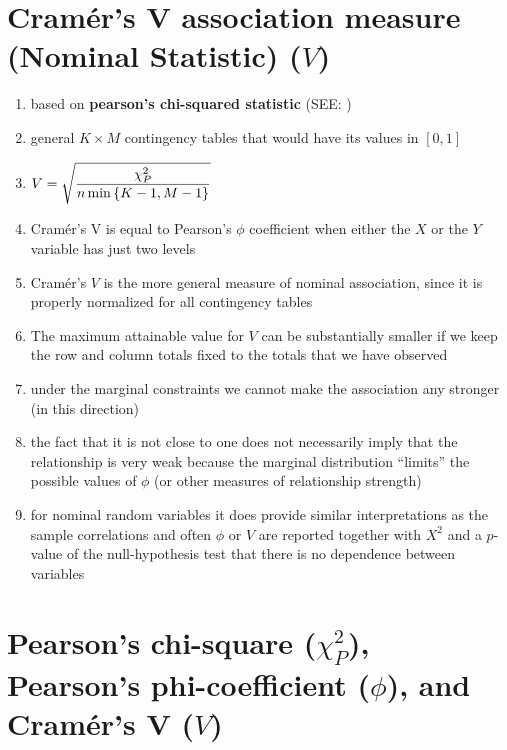 \section{Cramér’s V association measure (Nominal Statistic) ($V$) \cite{ism-1}} \label{Multivariate Distributions: Cramer’s V association measure (Nominal Statistic)}


\begin{enumerate}
    \item based on \textbf{pearson’s chi-squared statistic} (SEE: )

    \item general $K \times  M$ contingency tables that would have its values in $[0, 1]$

    \item $
        V = \sqrt{\dfrac{\chi_P^2}{
        n\min\left\{K-1,M-1\right\}
        }}
    $

    \item Cramér’s V is equal to Pearson’s $\phi$ coefficient when either the $X$ or the $Y$ variable has just two levels

    \item Cramér’s $V$ is the more general measure of nominal association, since it is properly normalized for all contingency tables

    \item The maximum attainable value for $V$ can be substantially smaller if we keep the row and column totals fixed to the totals that we have observed

    \item under the marginal constraints we cannot make the association any stronger (in this direction)

    \item the fact that it is not close to one does not necessarily imply that the relationship is very weak because the marginal distribution “limits” the possible values of $\phi$ (or other measures of relationship strength)

    \item for nominal random variables it does provide similar interpretations as the sample correlations and often $\phi$ or $V$ are reported together with $X^2$ and a $p$-value of the null-hypothesis test that there is no dependence between variables
\end{enumerate}


\section{Pearson’s chi-square ($\chi_P^2$), Pearson’s phi-coefficient ($\phi$), and Cramér’s V ($V$) \cite{ism-1}} \label{Multivariate Distributions: Pearson’s chi-square, Pearson’s phi-coefficient, and Cramér’s V}

